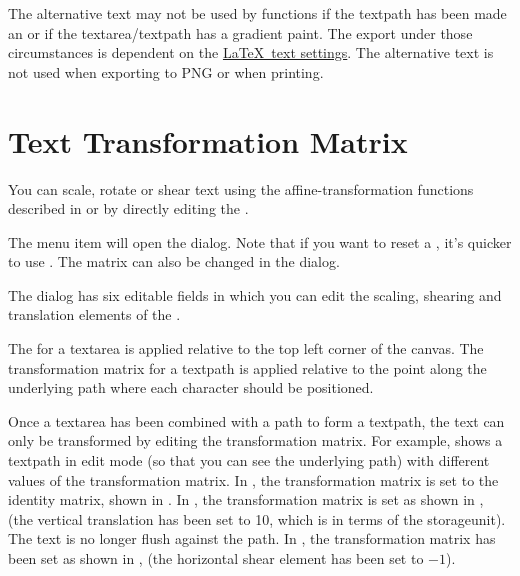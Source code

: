 \begin{important}
The alternative text may not be used by  functions if
the \gls*{textpath} has been made an  or if the
\gls*{textarea}\slash\gls*{textpath} has a gradient paint.
The export  under those circumstances is dependent on
the \hyperref[sec:texconfigtext]{\LaTeX\ text settings}.
The alternative text is not used when exporting to PNG or when
\gls{printing}.
\end{important}


\section{Text Transformation Matrix}\label{sec:textmatrix}

You can scale, rotate or shear text
using the \gls{affine-transformation} functions described in 
 or by directly editing the
.


The  menu item will open the 
dialog.
Note that if you want to reset a , 
it's quicker to use .
The matrix can also be changed in the  dialog.


The  dialog has six editable fields in which
you can edit the scaling, shearing and translation elements of the
.

The  for a \gls*{textarea} is
applied relative to the top left corner of the \gls{canvas}. The
transformation matrix for a \gls{textpath} is applied relative to
the point along the underlying path where each character should be
positioned.

Once a \gls*{textarea} has been combined with a \gls{path} to form a
\gls{textpath}, the text can only be transformed by editing the
transformation matrix.  For example, 
shows a \gls*{textpath} in edit mode (so that you can see the
underlying path) with different values of the transformation matrix.
In , the transformation matrix is
set to the identity matrix, shown in
.  In
, the transformation matrix is set
as shown in , (the vertical
translation has been set to 10, which is in terms of the
\gls{storageunit}). The text is no longer flush against
the path. In , the transformation
matrix has been set as shown in ,
(the horizontal shear element has been set to $-1$).

